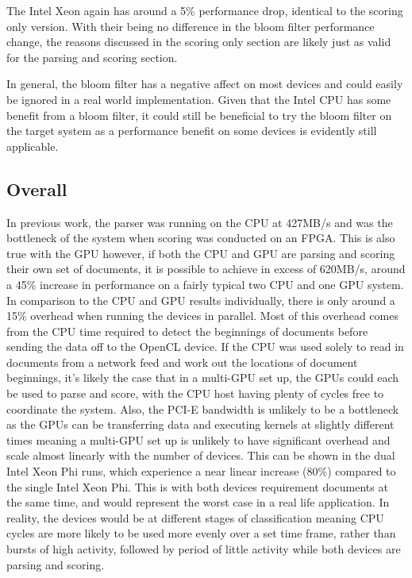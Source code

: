 The Intel Xeon again has around a 5\% performance drop, identical to the scoring
only version. With their being no difference in the bloom filter performance
change, the reasons discussed in the scoring only section are likely just as
valid for the parsing and scoring section.

In general, the bloom filter has a negative affect on most devices and could
easily be ignored in a real world implementation. Given that the Intel CPU
has some benefit from a bloom filter, it could still be beneficial to try the
bloom filter on the target system as a performance benefit on some devices is
evidently still applicable.

\subsection{Overall}

In previous work, the parser was running on the CPU at 427MB/s
\cite{HybridCPUFPGA} and was the bottleneck of the system when scoring was
conducted on an FPGA. This is also true with the GPU however, if both the CPU
and GPU are parsing and scoring their own set of documents, it is possible to
achieve in excess of 620MB/s, around a 45\% increase in performance on a fairly
typical two CPU and one GPU system. In comparison to the CPU and GPU results
individually, there is only around a 15\% overhead when running the devices in
parallel. Most of this overhead comes from the CPU time required to detect the
beginnings of documents before sending the data off to the OpenCL device. If the
CPU was used solely to read in documents from a network feed and work out the
locations of document beginnings, it's likely the case that in a multi-GPU set
up, the GPUs could each be used to parse and score, with the CPU host having
plenty of cycles free to coordinate the system. Also, the PCI-E bandwidth is
unlikely to be a bottleneck as the GPUs can be transferring data and executing
kernels at slightly different times meaning a multi-GPU set up is unlikely to
have significant overhead and scale almost linearly with the number of devices.
This can be shown in the dual Intel Xeon Phi runs, which experience a near
linear increase (80\%) compared to the single Intel Xeon Phi. This is with both
devices requirement documents at the same time, and would represent the worst
case in a real life application. In reality, the devices would be at different
stages of classification meaning CPU cycles are more likely to be used more
evenly over a set time frame, rather than bursts of high activity, followed by
period of little activity while both devices are parsing and scoring.
